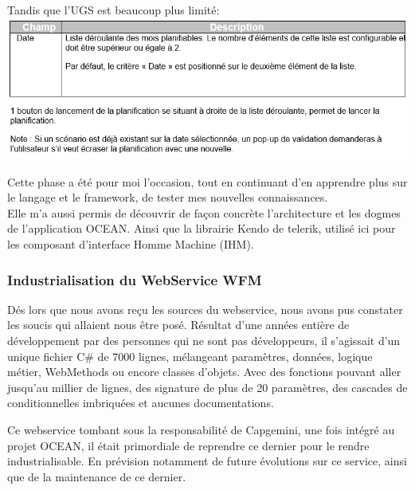 \documentclass{rapport}
\begin{document}
Tandis que l'UGS est beaucoup plus limité:\\
\includegraphics[width=.95\textwidth]{fig/fig19_PlanoHUGSFonct.png}

Cette phase a été pour moi l'occasion, tout en continuant d'en apprendre plus sur le langage et le framework, de tester mes nouvelles connaissances.\\
Elle m'a aussi permis de découvrir de façon concrète l'architecture et les dogmes de l'application OCEAN. Ainsi que la librairie Kendo de telerik, utilisé ici pour les composant d'interface Homme Machine (IHM).\\

\subsubsection{Industrialisation du WebService WFM}

Dés lors que nous avons reçu les sources du webservice, nous avons pus constater les soucis qui allaient nous être posé. Résultat d'une années entière de développement par des personnes qui ne sont pas développeurs, il s'agissait d'un unique fichier C\# de 7000 lignes, mélangeant paramètres, données, logique métier, WebMethods ou encore classes d'objets. Avec des fonctions pouvant aller jusqu'au millier de lignes, des signature de plus de 20 paramètres, des cascades de conditionnelles imbriquées et aucunes documentations.\\


Ce webservice tombant sous la responsabilité de Capgemini, une fois intégré au projet OCEAN, il était primordiale de reprendre ce dernier pour le rendre industrialisable. En prévision notamment de future évolutions sur ce service, ainsi que de la maintenance de ce dernier.\\
\end{document}
